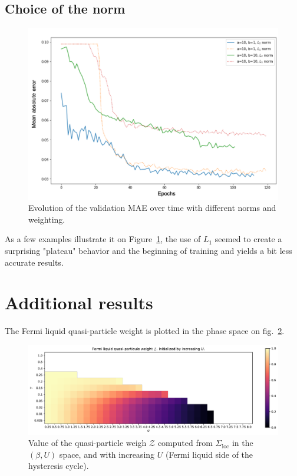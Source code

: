 \documentclass[reprint,amsmath,amssymb,aps,pra]{revtex4-2}
\begin{document}
\subsection{Choice of the norm\label{sec:nn:norm}}

\begin{figure}[H]
\includegraphics[width=\columnwidth]{analytical_continuation/norm_weighting_final.png}
\caption{\label{fig:norm1_or_2}Evolution of the validation MAE over time with different norms and weighting.}
\end{figure}

As a few examples illustrate it on Figure~\ref{fig:norm1_or_2}, the use of $L_1$ seemed to create a surprising "plateau" behavior and the beginning of training and yields a bit less accurate results. 

\section{Additional results}

The Fermi liquid quasi-particle weight is plotted in the phase space on fig.~\ref{fig:quasipart-Z-incrU}.

\begin{figure}
\includegraphics[width=\textwidth]{quasipart-Z-incrU.pdf}
\caption{\label{fig:quasipart-Z-incrU}Value of the quasi-particle weigh $\mathcal{Z}$ computed from $\Sigma_\text{loc}$ in the $(\beta,U)$ space, and with increasing $U$ (Fermi liquid side of the hysteresis cycle).}
\end{figure}
\end{document}

